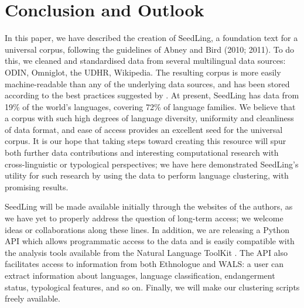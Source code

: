 \section{Conclusion and Outlook} \label{sec:conclusion}

In this paper, we have described the creation of SeedLing, a foundation text for a universal corpus, following the guidelines of Abney and Bird (2010; 2011). To do this, we cleaned and standardised data from several multilingual data sources: ODIN, Omniglot, the UDHR, Wikipedia. The resulting corpus is more easily machine-readable than any of the underlying data sources, and has been stored according to the best practices suggested by . At present, SeedLing has data from 19\% of the world's languages, covering 72\% of language families. We believe that a corpus with such high degrees of language diversity, uniformity and cleanliness of data format, and ease of access provides an excellent seed for the universal corpus. It is our hope that taking steps toward creating this resource will spur both further data contributions and interesting computational research with cross-linguistic or typological perspectives; we have here demonstrated SeedLing's utility for such research by using the data to perform language clustering, with promising results.

SeedLing will be made available initially through the websites of the authors, as we have yet to properly address the question of long-term access; we welcome ideas or collaborations along these lines. In addition, we are releasing a Python API which allows programmatic access to the data and is easily compatible with the analysis tools available from the Natural Language ToolKit \cite{BirdKleinLoper09}. The API also facilitates access to information from both Ethnologue and WALS: a user can extract information about languages, language classification, endangerment status, typological features, and so on. Finally, we will make our clustering scripts freely available. 


